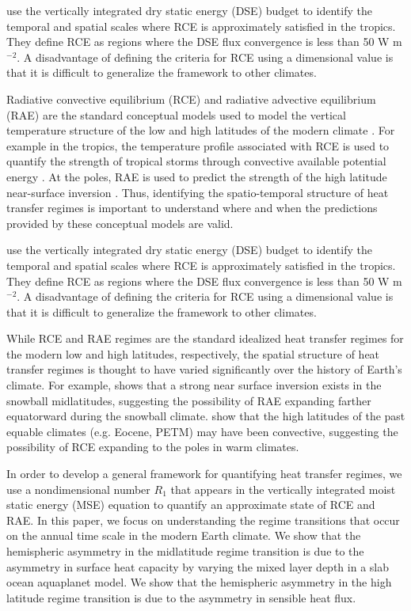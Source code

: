 \documentclass{ametsocV5}
\begin{document}
    
    
    
    \cite{jakob2019} use the vertically integrated dry static energy (DSE) budget to identify the temporal and spatial scales where RCE is approximately satisfied in the tropics. They define RCE as regions where the DSE flux convergence is less than 50 W m$^{-2}$. A disadvantage of defining the criteria for RCE using a dimensional value is that it is difficult to generalize the framework to other climates.

    Radiative convective equilibrium (RCE) and radiative advective equilibrium (RAE) are the standard conceptual models used to model the vertical temperature structure of the low and high latitudes of the modern climate \citep{wing2018, cronin2016}. For example in the tropics, the temperature profile associated with RCE is used to quantify the strength of tropical storms through convective available potential energy \citep{singh2013, seeley2015}. At the poles, RAE is used to predict the strength of the high latitude near-surface inversion \citep{payne2015,cronin2016}. Thus, identifying the spatio-temporal structure of heat transfer regimes is important to understand where and when the predictions provided by these conceptual models are valid.
    
     \cite{jakob2019} use the vertically integrated dry static energy (DSE) budget to identify the temporal and spatial scales where RCE is approximately satisfied in the tropics. They define RCE as regions where the DSE flux convergence is less than 50 W m$^{-2}$. A disadvantage of defining the criteria for RCE using a dimensional value is that it is difficult to generalize the framework to other climates.
    
    While RCE and RAE regimes are the standard idealized heat transfer regimes for the modern low and high latitudes, respectively, the spatial structure of heat transfer regimes is thought to have varied significantly over the history of Earth's climate. For example, \cite{pierrehumbert2005} shows that a strong near surface inversion exists in the snowball midlatitudes, suggesting the possibility of RAE expanding farther equatorward during the snowball climate. \cite{abbot2008} show that the high latitudes of the past equable climates (e.g. Eocene, PETM) may have been convective, suggesting the possibility of RCE expanding to the poles in warm climates.
    
    In order to develop a general framework for quantifying heat transfer regimes, we use a nondimensional number \(R_{1}\) that appears in the vertically integrated moist static energy (MSE) equation to quantify an approximate state of RCE and RAE. In this paper, we focus on understanding the regime transitions that occur on the annual time scale in the modern Earth climate. We show that the hemispheric asymmetry in the midlatitude regime transition is due to the asymmetry in surface heat capacity by varying the mixed layer depth in a slab ocean aquaplanet model. We show that the hemispheric asymmetry in the high latitude regime transition is due to the asymmetry in sensible heat flux.
\end{document}
